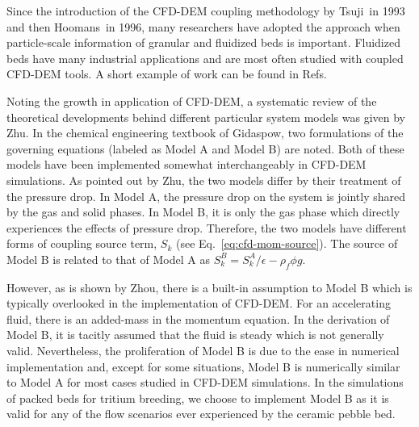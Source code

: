 Since the introduction of the CFD-DEM coupling methodology by Tsuji\etal~in 1993 and then Hoomans\etal~in 1996, many researchers have adopted the approach when particle-scale information of granular and fluidized beds is important.\cite{Tsuji1993,Hoomans1996} Fluidized beds have many industrial applications and are most often studied with coupled CFD-DEM tools. A short example of work can be found in Refs.~\cite{Xu1997,Patankar2001,Swasdisevi2005,Deen2007,Zhang2008,Chu2008,VanBuijtenen2011,Gruber2012,Peng2014}

Noting the growth in application of CFD-DEM, a systematic review of the theoretical developments behind different particular system models was given by Zhu\etal. In the chemical engineering textbook of Gidaspow, two formulations of the governing equations (labeled as Model A and Model B) are noted.\cite{gidaspow1994multiphase} Both of these models have been implemented somewhat interchangeably in CFD-DEM simulations. As pointed out by Zhu\etal, the two models differ by their treatment of the pressure drop. In Model A, the pressure drop on the system is jointly shared by the gas and solid phases. In Model B, it is only the gas phase which directly experiences the effects of pressure drop. Therefore, the two models have different forms of coupling source term, $S_k$ (see Eq.~\ref{eq:cfd-mom-source}). The source of Model B is related to that of Model A as $S_k^B = S_k^A/\epsilon - \rho_f\phi g$.

However, as is shown by Zhou\etal, there is a built-in assumption to Model B which is typically overlooked in the implementation of CFD-DEM. For an accelerating fluid, there is an added-mass in the momentum equation. In the derivation of Model B, it is tacitly assumed that the fluid is steady which is not generally valid.\cite{Zhou2010} Nevertheless, the proliferation of Model B is due to the ease in numerical implementation and, except for some situations, Model B is numerically similar to Model A for most cases studied in CFD-DEM simulations.\cite{Zhou2010} In the simulations of packed beds for tritium breeding, we choose to implement Model B as it is valid for any of the flow scenarios ever experienced by the ceramic pebble bed.







